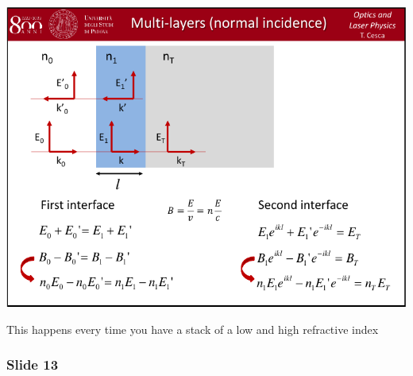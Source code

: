 \documentclass[../main/main.tex]{subfiles}
\begin{document}
\begin{minipage}[]{0.5\linewidth}
\centering
\includegraphics[page=12,width=1\textwidth]{../lessons/pdf_file/06_lecture.pdf}
\end{minipage}
\hspace{0.3cm}\vspace{0.3cm}
\begin{minipage}[c]{0.47\linewidth}

This happens every time you have a stack of a low and high refractive index

\end{minipage}

\subsubsection*{Slide 13}
\end{document}
